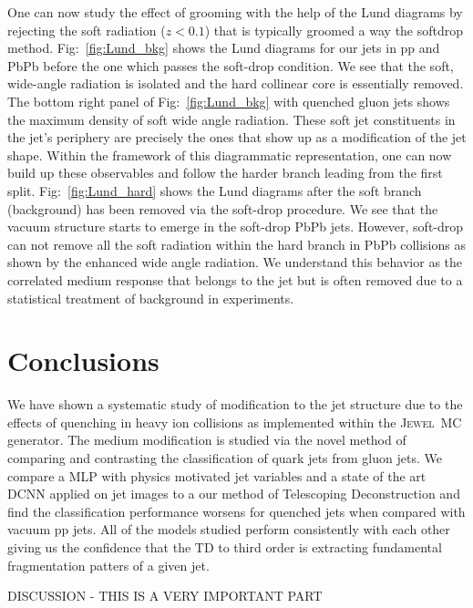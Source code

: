 \documentclass[notoc]{JHEP3}
\newcommand{\jw}{\textsc{Jewel}~}
\begin{document}
One can now study the effect of grooming with the help of the Lund diagrams by rejecting the soft radiation ($z < 0.1$) that is typically groomed a way the softdrop method. Fig:~\ref{fig:Lund_bkg} shows the Lund diagrams for our jets in pp and PbPb  before the one which passes the soft-drop condition. We see that the soft, wide-angle radiation is isolated and the hard collinear core is essentially removed. The bottom right panel of Fig:~\ref{fig:Lund_bkg} with quenched gluon jets shows the maximum density of soft wide angle radiation. These soft jet constituents in the jet's periphery are precisely the ones that show up as a modification of the jet shape. Within the framework of this diagrammatic representation, one can now build up these observables and follow the harder branch leading from the first split. Fig:~\ref{fig:Lund_hard} shows the Lund diagrams after the soft branch (background) has been removed via the soft-drop procedure. We see that the vacuum structure starts to emerge in the soft-drop PbPb jets. However, soft-drop can not remove all the soft radiation within the hard branch in PbPb collisions as shown by the enhanced wide angle radiation. We understand this behavior as the correlated medium response that belongs to the jet but is often removed due to a statistical treatment of background in experiments.    

\section{Conclusions}
\label{sec:conc}

We have shown a systematic study of modification to the jet structure due to the effects of quenching in heavy ion collisions as implemented within the \jw MC generator. The medium modification is studied via the novel method of comparing and contrasting the classification of quark jets from gluon jets. We compare a MLP with physics motivated jet variables and a state of the art DCNN applied on jet images to a our method of Telescoping Deconstruction and find the classification performance worsens for quenched jets when compared with vacuum pp jets. All of the models studied perform consistently with each other giving us the confidence that the TD to third order is extracting fundamental fragmentation patters of a given jet.  

DISCUSSION - THIS IS A VERY IMPORTANT PART 
\end{document}
